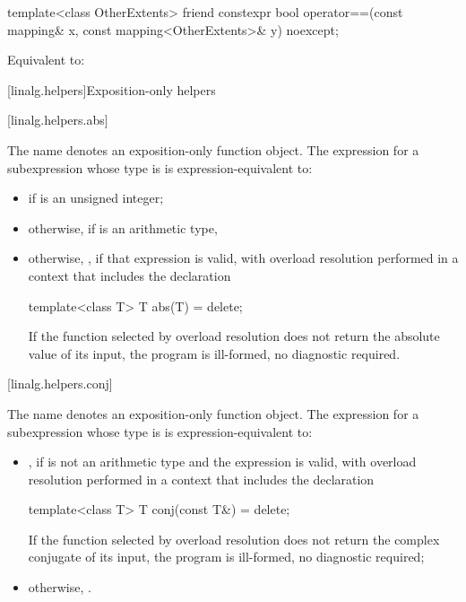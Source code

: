 \begin{itemdecl}
template<class OtherExtents>
  friend constexpr bool operator==(const mapping& x, const mapping<OtherExtents>& y) noexcept;
\end{itemdecl}

\begin{itemdescr}
\pnum
\effects
Equivalent to: 
\end{itemdescr}

[linalg.helpers]{Exposition-only helpers}

[linalg.helpers.abs]{}

\pnum
The name  denotes an exposition-only function object.
The expression  for a subexpression 
whose type is  is expression-equivalent to:
\begin{itemize}
\item
{} if  is an unsigned integer;
\item
otherwise,  if  is an arithmetic type,
\item
otherwise, ,
if that expression is valid,
with overload resolution performed in a context that includes the declaration
\begin{codeblock}
template<class T> T abs(T) = delete;
\end{codeblock}
If the function selected by overload resolution
does not return the absolute value of its input,
the program is ill-formed, no diagnostic required.
\end{itemize}

[linalg.helpers.conj]{}

\pnum
The name  denotes an exposition-only function object.
The expression  for a subexpression 
whose type is  is expression-equivalent to:
\begin{itemize}
\item
{},
if  is not an arithmetic type and
the expression  is valid,
with overload resolution performed in a context that includes the declaration
\begin{codeblock}
template<class T> T conj(const T&) = delete;
\end{codeblock}
If the function selected by overload resolution
does not return the complex conjugate of its input,
the program is ill-formed, no diagnostic required;
\item
otherwise, .
\end{itemize}

